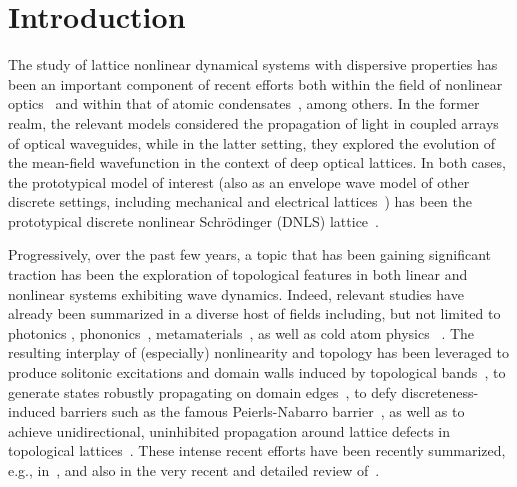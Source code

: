 \documentclass[reprint, amsmath,amssymb,aps,pre]{revtex4-2}
\begin{document}

\maketitle

\section{Introduction}\label{sec:intro}

The study of lattice nonlinear dynamical
systems with dispersive properties has been
an important component of recent efforts
both within the field of nonlinear 
optics~\cite{LEDERER20081} and within that
of atomic condensates~\cite{RevModPhys.78.179},
among others. In the former realm, the relevant
models considered the propagation of light
in coupled arrays of optical waveguides, while
in the latter setting, they explored the
evolution of the mean-field wavefunction in the
context of deep optical lattices.
In both cases, the prototypical model
of interest (also as an envelope wave
model of other discrete settings, including
mechanical and electrical lattices~\cite{remoissenet,DP06}) has been the
prototypical discrete nonlinear Schr{\"o}dinger (DNLS)
lattice~\cite{kev09}.

Progressively, over the past few years, a
topic that has been gaining significant
traction has been the exploration of
topological features in both linear and
nonlinear systems exhibiting wave dynamics.
Indeed, relevant studies have already been
summarized in a diverse host of fields including,
but not limited to photonics \cite{Ozawa2019},
phononics~\cite{Ma2019,Susstrunk2016}, 
metamaterials~\cite{Bertoldi}, as well
as cold
atom physics~ \cite{Cooper2019}. The resulting
interplay of (especially) nonlinearity
and topology has been leveraged to 
produce solitonic excitations and
domain walls induced by topological
bands~\cite{Lumer2013, Solnyshkov2017, Smirnova2019, Marzuola2019, Mukherjee2020,Chen2014, Hadad2017, Poddubny2018}, to generate states robustly propagating
on domain edges~\cite{Ablowitz2014, Leykam2016, Kartashov2016, Snee2019, Tao2020}, to defy
discreteness-induced barriers such as the famous
Peierls-Nabarro barrier~\cite{Abl21a}, as well as
to achieve unidirectional, uninhibited propagation
around lattice defects in topological lattices~\cite{Abl19a}. These intense recent efforts
have been recently summarized, e.g., in~\cite{Smirnova2020,Ma2021}, and also in the very recent
and detailed review of~\cite{cole}. 
\end{document}
